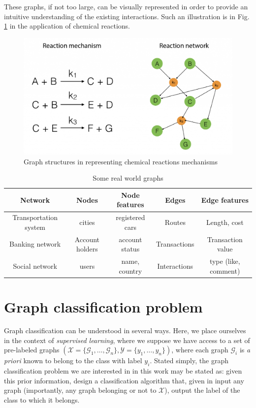 These graphs, if not too large, can be visually represented in order to provide an intuitive understanding of the existing interactions. Such an illustration is in Fig. \ref{fig:Graph_Example} in the application of chemical reactions.



\begin{figure}[H]
\centering
\includegraphics[scale=0.2]{figs/Graph_example.png}
\caption[Graph example to represent Chemical Reactions]{Graph structures in representing chemical reactions mechanisms}
\label{fig:Graph_Example}
\end{figure}


\begin{table}
\small
\begin{center}
\begin{tabular}{|c|c|c|c|c|}
\hline
{Network}  &  {Nodes} & {Node features}  & {Edges}  & {Edge features}  \\
\hline
{Transportation system}  &  {cities} & {registered cars}  & {Routes}  & {Length, cost }  \\
\hline
{Banking network}  &  {Account holders} & {account status}  & {Transactions}  & {Transaction value}  \\
\hline
{Social network}  &  {users} & {name, country}  & {Interactions}  & {type (like, comment)}  \\
\hline
\end{tabular}
\end{center}
\caption{Some real world graphs}
\label{table:Graph_examples}
\end{table}

\section{Graph classification problem}
\label{sec:Graph_classification_problem}
Graph classification can be understood in several ways. Here, we place ourselves in the context of \emph{supervised learning}, where we suppose we have access to a set of pre-labeled graphs  $(\mathcal{X}=\{\mathcal{G}_1,\ldots,\mathcal{G}_n\}, \mathcal{Y}=\{y_1,\ldots,y_n\})$, where each graph $\mathcal{G}_i$ is \emph{a priori} known to belong to the class with label $y_i$. Stated simply, the graph classification problem we are interested in in this work may be stated as: given this prior information, design a classification algorithm that, given in input any graph (importantly, any graph belonging or not to $\mathcal{X}$), output the label of the class to which it belongs. 


